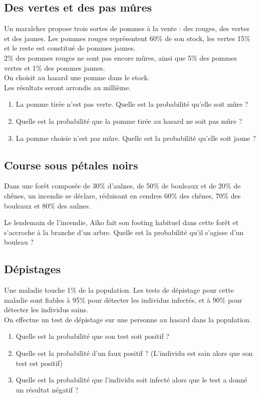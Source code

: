 \documentclass[oneside,12pt]{article}          %
\begin{document}
\subsection{Des vertes et des pas mûres}
 Un maraîcher propose trois sortes de pommes à la vente : des rouges, des vertes et des jaunes. Les pommes rouges représentent 60$\%$ de son stock, les vertes 15$\%$ et le reste est constitué de pommes jaunes. \\
2$\%$ des pommes rouges ne sont pas encore mûres, ainsi que 5$\%$ des pommes vertes et 1$\%$ des pommes jaunes. \\
On choisit au hasard une pomme dans le stock.\\
Les résultats seront arrondis au millième.
\begin{enumerate}
    \item La pomme tirée n'est pas verte. Quelle est la probabilité qu'elle soit mûre ?
    \item Quelle est la probabilité que la pomme tirée au hasard ne soit pas mûre ?
    \item La pomme choisie n'est pas mûre. Quelle est la probabilité qu'elle soit jaune ?
\end{enumerate}



\subsection{Course sous pétales noirs}
Dans une forêt composée de 30$\%$ d'aulnes, de 50$\%$ de bouleaux et de 20$\%$ de chênes, un incendie se déclare, réduisant en cendres 60$\%$ des chênes, 70$\%$ des bouleaux et 80$\%$ des aulnes.

Le lendemain de l'incendie, Aïko fait son footing habituel dans cette forêt et s'accroche à la branche d'un arbre. Quelle est la probabilité qu'il s'agisse d'un bouleau ?


\subsection{Dépistages}
 Une maladie touche 1$\%$ de la population. Les tests de dépistage pour cette maladie sont fiables à 95$\%$ pour détecter les individus infectés, et à 90$\%$ pour détecter les individus sains. \\
On effectue un test de dépistage sur une personne au hasard dans la population.
\begin{enumerate}
    \item Quelle est la probabilité que son test soit positif ?
    \item Quelle est la probabilité d'un faux positif ? (L'individu est sain alors que son test est positif)
    \item Quelle est la probabilité que l'individu soit infecté alors que le test a donné un résultat négatif ?
\end{enumerate}
\end{document}
